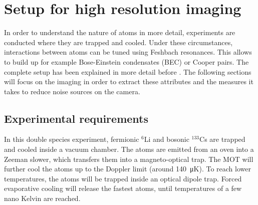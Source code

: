 \chapter{Setup for high resolution imaging}

In order to understand the nature of atoms in more detail, experiments are conducted where they are trapped and cooled. Under these circumstances, interactions between atoms can be tuned using Feshbach resonances. This allows to build up for example Bose-Einstein condensates (BEC) or Cooper pairs. The complete setup has been explained in more detail before \cite{Repp2013a}. The following sections will focus on the imaging in order to extract these attributes and the measures it takes to reduce noise sources on the camera.

\section{Experimental requirements}
\label{ch:expreq}
In this double species experiment, fermionic $^6$Li and bosonic $^{133}$Cs are trapped and cooled inside a vacuum chamber. The atoms are emitted from an oven into a Zeeman slower, which transfers them into a magneto-optical trap. The MOT will further cool the atoms up to the Doppler limit (around \SI{140}{\micro\kelvin}). To reach lower temperatures, the atoms will be trapped inside an optical dipole trap. Forced evaporative cooling will release the fastest atoms, until temperatures of a few nano Kelvin are reached.


